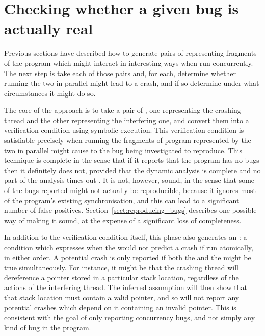 
\section{Checking whether a given bug is actually real}
\label{sect:using:check_realness}

Previous sections have described how to generate pairs of
{\StateMachines} representing fragments of the program which might
interact in interesting ways when run concurrently.  The next step is
take each of those pairs and, for each, determine whether running the
two {\StateMachines} in parallel might lead to a crash, and if so
determine under what circumstances it might do so.

The core of the approach is to take a pair of {\StateMachines}, one
representing the crashing thread and the other representing the
interfering one, and convert them into a verification condition using
symbolic execution.  This verification condition is satisfiable
precisely when running the fragments of program represented by the two
{\StateMachines} in parallel might cause to the bug being investigated
to reproduce.  This technique is complete in the sense that if it
reports that the program has no bugs then it definitely does not,
provided that the dynamic analysis is complete and no part of the
analysis times out .  It
is not, however, sound, in the sense that some of the bugs reported
might not actually be reproducible, because it ignores most of the
program's existing synchronisation, and this can lead to a significant
number of false positives.  Section~\ref{sect:reproducing_bugs}
describes one possible way of making it sound, at the expense of a
significant loss of completeness.

In addition to the verification condition itself, this phase also
generates an : a condition which
expresses when the {\StateMachines} would not predict a crash if run
atomically, in either order.  A potential crash is only reported if
both the  and the  might be true simultaneously.  For instance, it might be
that the crashing thread will dereference a pointer stored in a
particular stack location, regardless of the actions of the
interfering thread.  The inferred assumption will then show that that
stack location must contain a valid pointer, and so {\technique} will
not report any potential crashes which depend on it containing an
invalid pointer.  This is consistent with the goal of only reporting
concurrency bugs, and not simply any kind of bug in the program.

